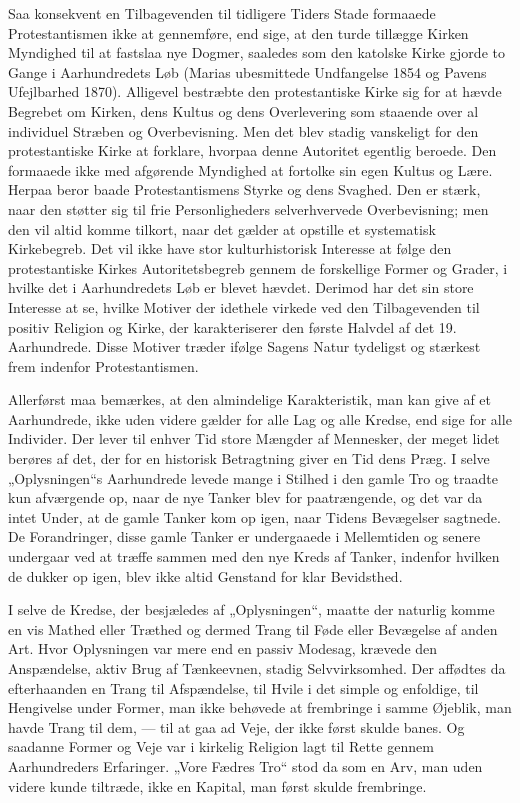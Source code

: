 \documentclass[12pt,a4paper,openany]{book}
\newcommand{\opage}[1]{\marginnote{\footnotesize\textit{[#1]}}}
\begin{document}
Saa konsekvent en Tilbagevenden til tidligere Tiders Stade formaaede
Protestantismen ikke at gennemføre, end sige, at den turde
tillægge Kirken Myndighed til at fastslaa nye Dogmer, saaledes som
den katolske Kirke gjorde to Gange i Aarhundredets Løb (Marias
ubesmittede Undfangelse 1854 og Pavens Ufejlbarhed 1870). Alligevel
bestræbte den protestantiske Kirke sig for at hævde Begrebet
om Kirken, dens Kultus og dens Overlevering som staaende over al
individuel Stræben og Overbevisning. Men det blev stadig vanskeligt
\opage{120}for den protestantiske Kirke at forklare, hvorpaa denne Autoritet
egentlig beroede. Den formaaede ikke med afgørende Myndighed at
fortolke sin egen Kultus og Lære. Herpaa beror baade Protestantismens
Styrke og dens Svaghed. Den er stærk, naar den støtter sig
til frie Personligheders selverhvervede Overbevisning; men den vil
altid komme tilkort, naar det gælder at opstille et systematisk Kirkebegreb.
Det vil ikke have stor kulturhistorisk Interesse at følge den
protestantiske Kirkes Autoritetsbegreb gennem de forskellige Former
og Grader, i hvilke det i Aarhundredets Løb er blevet hævdet.
Derimod har det sin store Interesse at se, hvilke Motiver der idethele
virkede ved den Tilbagevenden til positiv Religion og Kirke, der
karakteriserer den første Halvdel af det 19. Aarhundrede. Disse Motiver
træder ifølge Sagens Natur tydeligst og stærkest frem indenfor
Protestantismen.

Allerførst maa bemærkes, at den almindelige Karakteristik, man
kan give af et Aarhundrede, ikke uden videre gælder for alle Lag og
alle Kredse, end sige for alle Individer. Der lever til enhver Tid store
Mængder af Mennesker, der meget lidet berøres af det, der for en
historisk Betragtning giver en Tid dens Præg. I selve „Oplysningen“s
Aarhundrede levede mange i Stilhed i den gamle Tro og traadte kun
afværgende op, naar de nye Tanker blev for paatrængende, og det
var da intet Under, at de gamle Tanker kom op igen, naar Tidens
Bevægelser sagtnede. De Forandringer, disse gamle Tanker er undergaaede
i Mellemtiden og senere undergaar ved at træffe sammen
med den nye Kreds af Tanker, indenfor hvilken de dukker op igen,
blev ikke altid Genstand for klar Bevidsthed.

I selve de Kredse, der besjæledes af „Oplysningen“, maatte der
naturlig komme en vis Mathed eller Træthed og dermed Trang til Føde
eller Bevægelse af anden Art. Hvor Oplysningen var mere end en
passiv Modesag, krævede den Anspændelse, aktiv Brug af Tænkeevnen,
stadig Selvvirksomhed. Der affødtes da efterhaanden en Trang
til Afspændelse, til Hvile i det simple og enfoldige, til Hengivelse
under Former, man ikke behøvede at frembringe i samme Øjeblik,
man havde Trang til dem, --- til at gaa ad Veje, der ikke først skulde
banes. Og saadanne Former og Veje var i kirkelig Religion lagt til
Rette gennem Aarhundreders Erfaringer. „Vore Fædres Tro“ stod
da som en Arv, man uden videre kunde tiltræde, ikke en Kapital,
man først skulde frembringe.
\end{document}
